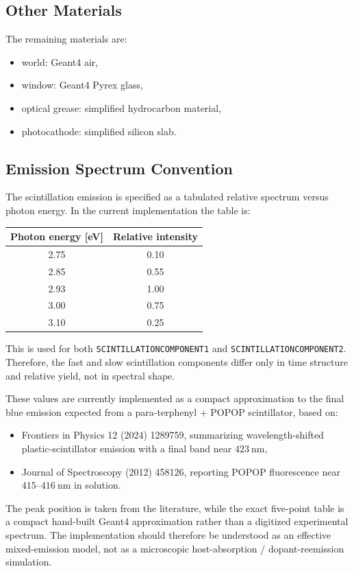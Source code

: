 \subsection{Other Materials}
The remaining materials are:
\begin{itemize}
\item world: Geant4 air,
\item window: Geant4 Pyrex glass,
\item optical grease: simplified hydrocarbon material,
\item photocathode: simplified silicon slab.
\end{itemize}

\subsection{Emission Spectrum Convention}
The scintillation emission is specified as a tabulated relative spectrum versus photon energy. In the current implementation the table is:
\begin{center}
\begin{tabular}{cc}
\toprule
Photon energy [eV] & Relative intensity \\
\midrule
2.75 & 0.10 \\
2.85 & 0.55 \\
2.93 & 1.00 \\
3.00 & 0.75 \\
3.10 & 0.25 \\
\bottomrule
\end{tabular}
\end{center}

This is used for both \texttt{SCINTILLATIONCOMPONENT1} and \texttt{SCINTILLATIONCOMPONENT2}. Therefore, the fast and slow scintillation components differ only in time structure and relative yield, not in spectral shape.

These values are currently implemented as a compact approximation to the final blue emission expected from a para-terphenyl + POPOP scintillator, based on:
\begin{itemize}
\item Frontiers in Physics 12 (2024) 1289759, summarizing wavelength-shifted plastic-scintillator emission with a final band near $423~\mathrm{nm}$,
\item Journal of Spectroscopy (2012) 458126, reporting POPOP fluorescence near $415$--$416~\mathrm{nm}$ in solution.
\end{itemize}

The peak position is taken from the literature, while the exact five-point table is a compact hand-built Geant4 approximation rather than a digitized experimental spectrum. The implementation should therefore be understood as an effective mixed-emission model, not as a microscopic host-absorption / dopant-reemission simulation.

